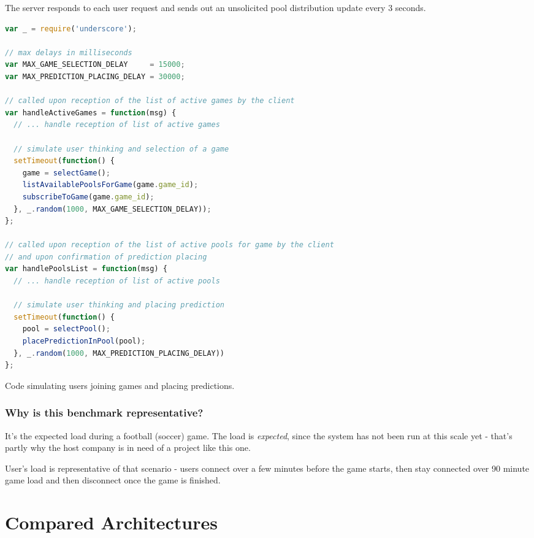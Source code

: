 \documentclass{uvamscse}
\begin{document}
The server responds to each user request and sends out an unsolicited pool distribution update every 3 seconds.

\begin{sourcecode}
\begin{lstlisting}[language=javascript]
var _ = require('underscore');

// max delays in milliseconds
var MAX_GAME_SELECTION_DELAY     = 15000;
var MAX_PREDICTION_PLACING_DELAY = 30000;

// called upon reception of the list of active games by the client
var handleActiveGames = function(msg) {
  // ... handle reception of list of active games

  // simulate user thinking and selection of a game
  setTimeout(function() {
    game = selectGame();
    listAvailablePoolsForGame(game.game_id);
    subscribeToGame(game.game_id);
  }, _.random(1000, MAX_GAME_SELECTION_DELAY));
};

// called upon reception of the list of active pools for game by the client
// and upon confirmation of prediction placing
var handlePoolsList = function(msg) {
  // ... handle reception of list of active pools

  // simulate user thinking and placing prediction
  setTimeout(function() {
    pool = selectPool();
    placePredictionInPool(pool);
  }, _.random(1000, MAX_PREDICTION_PLACING_DELAY))
};

\end{lstlisting}
\caption{Code simulating users joining games and placing predictions.}
\end{sourcecode}

\subsubsection{Why is this benchmark representative?}

It's the expected load during a football (soccer) game. The load is \textit{expected}, since the system has not been run at this scale yet - that's partly why the host company is in need of a project like this one.

User's load is representative of that scenario - users connect over a few minutes before the game starts, then stay connected over 90 minute game load and then disconnect once the game is finished.

\section{Compared Architectures}\label{Compared Architectures}
\end{document}

